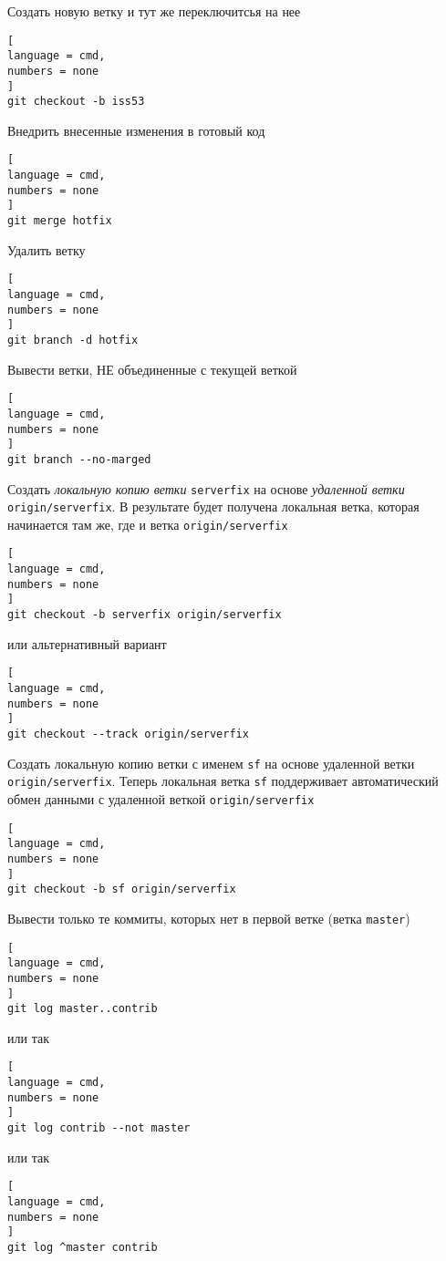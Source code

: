 \documentclass[%
	11pt,
	a4paper,
	utf8,
		]{article}
\begin{document}
Создать новую ветку и тут же переключитсья на нее

\begin{lstlisting}[
language = cmd,
numbers = none
]
git checkout -b iss53
\end{lstlisting}


Внедрить внесенные изменения в готовый код

\begin{lstlisting}[
language = cmd,
numbers = none
]
git merge hotfix
\end{lstlisting}

Удалить ветку 

\begin{lstlisting}[
language = cmd,
numbers = none
]
git branch -d hotfix
\end{lstlisting}

Вывести ветки, НЕ объединенные с текущей веткой

\begin{lstlisting}[
language = cmd,
numbers = none
]
git branch --no-marged
\end{lstlisting}


Создать \emph{локальную копию ветки} \texttt{serverfix} на основе \emph{удаленной ветки} \texttt{origin/serverfix}. В результате будет получена локальная ветка, которая начинается там же, где и ветка \texttt{origin/serverfix}

\begin{lstlisting}[
language = cmd,
numbers = none
]
git checkout -b serverfix origin/serverfix
\end{lstlisting}

\noindent или альтернативный вариант

\begin{lstlisting}[
language = cmd,
numbers = none
]
git checkout --track origin/serverfix
\end{lstlisting}

Создать локальную копию ветки с именем \texttt{sf} на основе удаленной ветки \texttt{origin/serverfix}. Теперь локальная ветка \texttt{sf} поддерживает автоматический обмен данными с удаленной веткой \texttt{origin/serverfix}

\begin{lstlisting}[
language = cmd,
numbers = none
]
git checkout -b sf origin/serverfix
\end{lstlisting}


Вывести только те коммиты, которых нет в первой ветке (ветка \texttt{master})

\begin{lstlisting}[
language = cmd,
numbers = none
]
git log master..contrib
\end{lstlisting}
или так
\begin{lstlisting}[
language = cmd,
numbers = none
]
git log contrib --not master
\end{lstlisting}
или так
\begin{lstlisting}[
language = cmd,
numbers = none
]
git log ^master contrib
\end{lstlisting}
\end{document}
